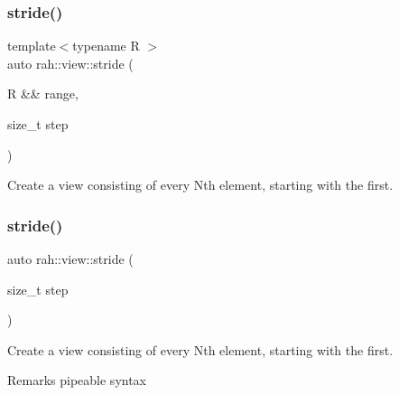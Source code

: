 \subsubsection{\texorpdfstring{stride()}{stride()}\hspace{0.1cm}{\footnotesize\ttfamily [1/2]}}
{\footnotesize\ttfamily template$<$typename R $>$ \\
auto rah\+::view\+::stride (\begin{DoxyParamCaption}\item[{R \&\&}]{range,  }\item[{size\+\_\+t}]{step }\end{DoxyParamCaption})}



Create a view consisting of every Nth element, starting with the first. 


\begin{DoxyCodeInclude}{0}
\end{DoxyCodeInclude}
\mbox{\label{namespacerah_1_1view_a6b2ab3621be4004c35d77f06165fce78}} 
\subsubsection{\texorpdfstring{stride()}{stride()}\hspace{0.1cm}{\footnotesize\ttfamily [2/2]}}
{\footnotesize\ttfamily auto rah\+::view\+::stride (\begin{DoxyParamCaption}\item[{size\+\_\+t}]{step }\end{DoxyParamCaption})\hspace{0.3cm}{\ttfamily [inline]}}



Create a view consisting of every Nth element, starting with the first. 

\begin{DoxyRemark}{Remarks}
pipeable syntax
\end{DoxyRemark}

